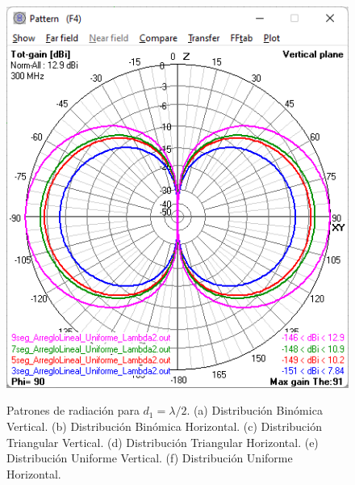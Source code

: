 \documentclass[11pt]{report}
\begin{document}
\begin{figure}[h!]
{		\includegraphics[scale=0.47]{IMAGENES/b15}\label{b15}}
	
	\caption{Patrones de radiación para $d_1=\lambda/2$.
		(a) Distribución Binómica Vertical.
		(b) Distribución Binómica Horizontal.
		(c) Distribución Triangular Vertical.
		(d) Distribución Triangular Horizontal.
		(e) Distribución Uniforme Vertical.
		(f) Distribución Uniforme Horizontal.}
\end{figure}
\end{document}
